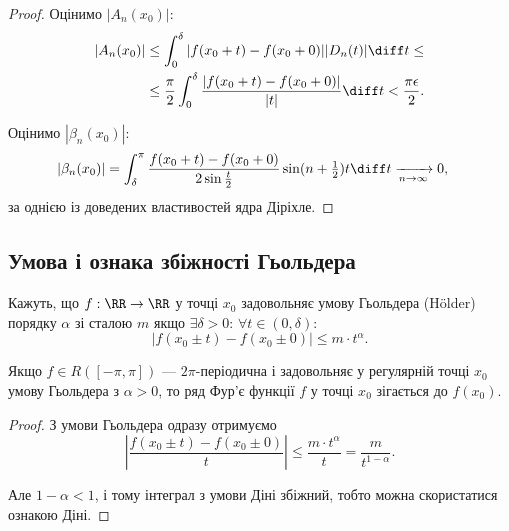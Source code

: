 \begin{proof}
    Оцінимо $|A_n(x_0)|$:
    \begin{equation}
        \begin{aligned}
            |A_n(x_0)|
            &\le \int_0^\delta |f(x_0 + t) - f(x_0 + 0)| |D_n(t)| \diff t \le \\
            &\le \frac{\pi}{2} \int_0^\delta \frac{|f(x_0 + t) - f(x_0 + 0)|}{|t|} \diff t < \frac{\pi \epsilon}{2}.
        \end{aligned}
    \end{equation}
    
    Оцінимо $|\beta_n(x_0)|$:
    \begin{equation}
        \begin{aligned}
            |\beta_n(x_0)|
            &= \int_\delta^\pi \frac{f(x_0 + t) - f(x_0 + 0)}{2 \sin \tfrac{t}{2}} \sin (n + \tfrac{1}{2}) t \diff t \xrightarrow[n \to \infty]{} 0,
        \end{aligned}
    \end{equation}
    за однією із доведених властивостей ядра Діріхле.
\end{proof}

\subsection{Умова і ознака збіжності Гьольдера}

\begin{definition}
    Кажуть, що $f: \RR \to \RR$ у точці $x_0$ задовольняє умову Гьольдера (H\"older) порядку $\alpha$ зі сталою $m$ якщо $\exists \delta > 0$: $\forall t \in (0, \delta)$:
    \begin{equation}
        |f(x_0 \pm t) - f(x_0 \pm 0)| \le m \cdot t^\alpha. 
    \end{equation}
\end{definition}

\begin{theorem}
    Якщо $f \in R([-\pi, \pi])$ --- $2\pi$-періодична і задовольняє у регулярній точці $x_0$ умову Гьольдера з $\alpha > 0$, то ряд Фур'є функції $f$ у точці $x_0$ зігається до $f(x_0)$.
\end{theorem}
\begin{proof}
    З умови Гьольдера одразу отримуємо
    \begin{equation}
        \left| \frac{f(x_0 \pm t) - f(x_0 \pm 0)}{t} \right| \le \frac{m \cdot t^\alpha}{t} = \frac{m}{t^{1 - \alpha}}.
    \end{equation}
    
    Але $1 - \alpha < 1$, і тому інтеграл з умови Діні збіжний, тобто можна скористатися ознакою Діні.
\end{proof}

